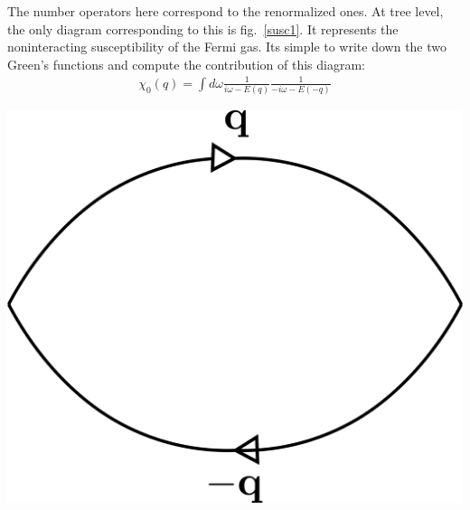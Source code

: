 \documentclass[14pt]{extarticle}
\begin{document}
\begin{minipage}{300pt}
The number operators here correspond to the renormalized ones. At tree level, the only diagram corresponding to this is fig.~\ref{susc1}. It represents the noninteracting susceptibility of the Fermi gas. Its simple to write down the two Green's functions and compute the contribution of this diagram:
\begin{equation}\begin{aligned}
\chi_0(q) = \int d\omega \frac{1}{i\omega - E(q)}\frac{1}{-i\omega  -E(-q)}
\end{aligned}\end{equation}
\end{minipage}
\hspace*{30pt}
\begin{minipage}{200pt}
\begin{center}
\includegraphics[scale=0.3]{./figures/term10.png}
\label{susc2}
\end{center}
\end{minipage}
 
\end{document}
